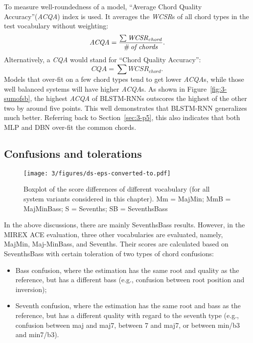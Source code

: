 To measure well-roundedness of a model, ``Average Chord Quality Accuracy''(\textit{ACQA}) index \cite{cho2014improved} is used. It averages the \textit{WCSR}s of all chord types in the test vocabulary without weighting:
\begin{equation}
	\mathit{ACQA = {{\sum{WCSR_{chord}}} \over {\#\,of\,chords}}}.
	\label{eq:3-acqa}
\end{equation}
Alternatively, a \textit{CQA} would stand for ``Chord Quality Accuracy'':
\begin{equation}
\mathit{CQA = \sum{WCSR_{chord}}}.
\label{eq:3-cqa}
\end{equation}
Models that over-fit on a few chord types tend to get lower \textit{ACQA}s, while those well balanced systems will have higher \textit{ACQA}s. As shown in Figure~\ref{fig:3-sumofsb}, the highest \textit{ACQA} of BLSTM-RNNs outscores the highest of the other two by around five points. This well demonstrates that BLSTM-RNN generalizes much better. Referring back to Section~\ref{sec:3-p5}, this also indicates that both MLP and DBN over-fit the common chords.

\subsection{Confusions and tolerations} \label{sec:3-p8}

\begin{figure}[htb]
	\centering
	\texttt{[image: 3/figures/ds-eps-converted-to.pdf]}
	\caption{Boxplot of the score differences of different vocabulary (for all system variants considered in this chapter). Mm = MajMin; MmB = MajMinBass; S = Sevenths; SB = SeventhsBass}
	\label{fig:3-ds}
\end{figure}

In the above discussions, there are mainly SeventhsBass results. However, in the MIREX ACE evaluation, three other vocabularies are evaluated, namely, MajMin, Maj-MinBass, and Sevenths. Their scores are calculated based on SeventhsBass with certain toleration of two types of chord confusions:
\begin{itemize}
	\item Bass confusion, where the estimation has the same root and quality as the reference, but has a different bass (e.g., confusion between root position and inversion);
	\item Seventh confusion, where the estimation has the same root and bass as the reference, but has a different quality with regard to the seventh type (e.g., confusion between maj and maj7, between 7 and maj7, or between min/b3 and min7/b3).
\end{itemize}

